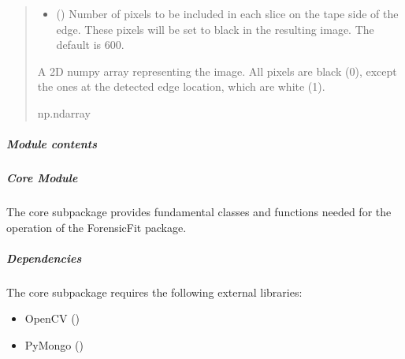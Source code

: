\documentclass[letterpaper,10pt,english]{sphinxmanual}
\begin{document}
\begin{fulllineitems}
\begin{fulllineitems}
\begin{quote}
\begin{description}
\begin{itemize}
\item {} 
\sphinxAtStartPar
{} (\sphinxstyleliteralemphasis{\sphinxupquote{, }}) \textendash{} Number of pixels to be included in each slice on the tape side of the edge.
These pixels will be set to black in the resulting image. The default is 600.

\end{itemize}

\sphinxAtStartPar
{} \textendash{} A 2D numpy array representing the image. All pixels are black (0), except the ones
at the detected edge location, which are white (1).

\sphinxAtStartPar
np.ndarray

\end{description}\end{quote}

\end{fulllineitems}


\end{fulllineitems}



\subparagraph{Module contents}
\label{\detokenize{forensicfit.core:module-forensicfit.core}}\label{\detokenize{forensicfit.core:module-contents}}

\subparagraph{Core Module}
\label{\detokenize{forensicfit.core:core-module}}\label{\detokenize{forensicfit.core:id1}}
\sphinxAtStartPar
The core subpackage provides fundamental classes and functions needed for the operation of the ForensicFit package.


\subparagraph{Dependencies}
\label{\detokenize{forensicfit.core:dependencies}}
\sphinxAtStartPar
The core subpackage requires the following external libraries:
\begin{itemize}
\item {} 
\sphinxAtStartPar
OpenCV ()

\item {} 
\sphinxAtStartPar
PyMongo ()

\end{itemize}
\end{document}
